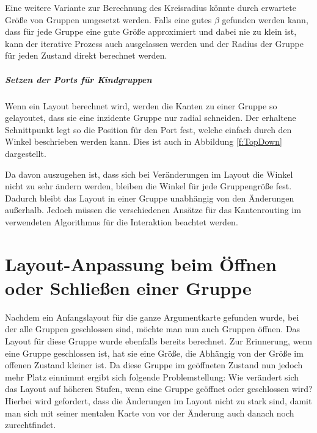 Eine weitere Variante zur Berechnung des Kreisradius könnte durch erwartete Größe von Gruppen umgesetzt werden. 
Falls eine gutes $\beta$ gefunden werden kann, dass für jede Gruppe eine gute Größe approximiert und dabei nie zu klein ist, kann der iterative Prozess auch ausgelassen werden
und der Radius der Gruppe für jeden Zustand direkt berechnet werden.

		
							



\subparagraph{Setzen der Ports für Kindgruppen}
Wenn ein Layout berechnet wird, werden die Kanten zu einer Gruppe so gelayoutet, dass sie eine inzidente Gruppe nur radial schneiden.
Der erhaltene Schnittpunkt legt so die Position für den Port fest, welche einfach durch den Winkel beschrieben werden kann. 
Dies ist auch in Abbildung  \ref{f:TopDown} dargestellt.

Da davon auszugehen ist, dass sich bei Veränderungen im Layout die Winkel nicht zu sehr ändern werden, bleiben die Winkel für jede Gruppengröße fest.
Dadurch bleibt das Layout in einer Gruppe unabhängig von den Änderungen außerhalb. 
Jedoch müssen die verschiedenen Ansätze für das Kantenrouting im verwendeten Algorithmus für die Interaktion beachtet werden.




\section{Layout-Anpassung beim Öffnen oder Schließen einer Gruppe}
Nachdem ein Anfangslayout für die ganze Argumentkarte gefunden wurde, bei der alle Gruppen geschlossen sind, möchte man nun auch Gruppen öffnen. 
Das Layout für diese Gruppe wurde ebenfalls bereits berechnet. Zur Erinnerung, wenn eine Gruppe geschlossen ist, hat sie eine Größe, 
die Abhängig von der Größe im offenen Zustand kleiner ist. 
Da diese Gruppe im geöffneten Zustand nun jedoch mehr Platz einnimmt ergibt sich folgende Problemstellung:
Wie verändert sich das Layout auf höheren Stufen, wenn eine Gruppe geöffnet oder geschlossen wird? 
Hierbei wird gefordert, dass die Änderungen im Layout nicht zu stark sind, damit man sich mit seiner mentalen Karte von vor der Änderung auch danach noch zurechtfindet.

